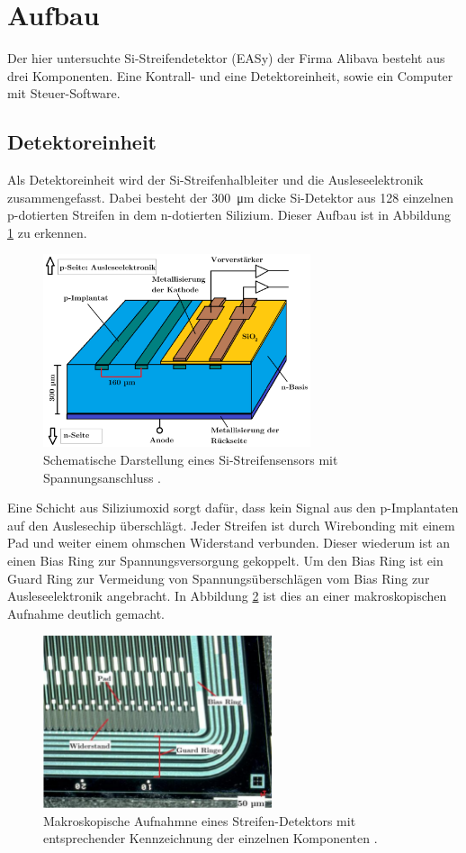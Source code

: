 \newpage
\section{Aufbau}
\label{sec:Aufbau}
Der hier untersuchte Si-Streifendetektor (EASy) der Firma Alibava besteht aus drei Komponenten. Eine Kontrall- und eine Detektoreinheit, sowie ein Computer mit Steuer-Software.

\subsection{Detektoreinheit}
\label{sec:Detektoreinheit}
 Als Detektoreinheit wird der Si-Streifenhalbleiter und die Ausleseelektronik
 zusammengefasst. Dabei besteht der \SI{300}{\micro\meter} dicke Si-Detektor
 aus 128 einzelnen p-dotierten Streifen in dem n-dotierten Silizium.  Dieser
 Aufbau ist in Abbildung \ref{fig:schema} zu erkennen.
 \begin{figure}[htb]
   \centering
   \includegraphics[width=0.7\textwidth]{images/Schema.png}
   \caption{Schematische Darstellung eines Si-Streifensensors mit Spannungsanschluss \cite{anleitung}.}
   \label{fig:schema}
 \end{figure}
 \FloatBarrier
Eine Schicht aus Siliziumoxid sorgt dafür, dass kein Signal aus den p-Implantaten
auf den Auslesechip überschlägt. Jeder Streifen ist durch Wirebonding mit einem Pad und weiter
einem ohmschen Widerstand
verbunden. Dieser wiederum ist an einen Bias Ring zur Spannungsversorgung gekoppelt.
Um den Bias Ring ist ein Guard Ring zur Vermeidung von Spannungsüberschlägen vom Bias
Ring zur Ausleseelektronik angebracht. In Abbildung \ref{fig:streifendetektor} ist dies an
einer makroskopischen Aufnahme deutlich gemacht.
\begin{figure}[htb]
  \centering
  \includegraphics[width=0.6\textwidth]{images/Sensor.png}
  \caption{Makroskopische Aufnahmne eines Streifen-Detektors mit entsprechender Kennzeichnung der einzelnen Komponenten \cite{anleitung}.}
  \label{fig:streifendetektor}
\end{figure}
